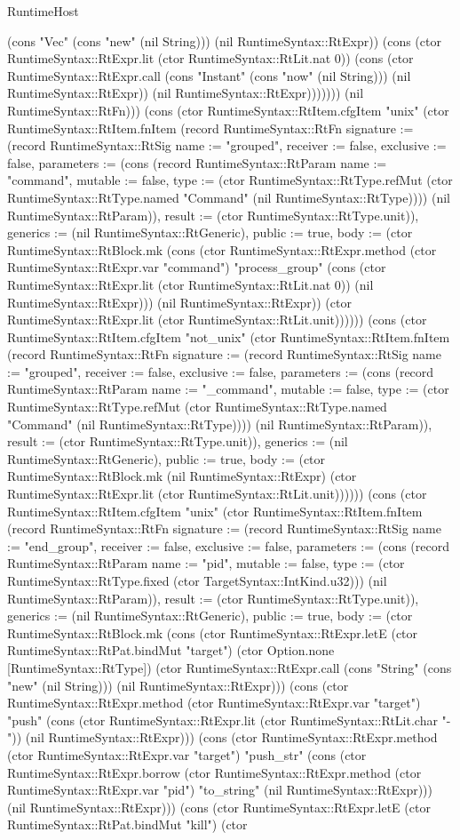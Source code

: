 \begin{lexlean}{RuntimeHost}
\begin{semanticmodule}
{(cons "Vec" (cons "new" (nil String))) (nil RuntimeSyntax::RtExpr)) (cons (ctor RuntimeSyntax::RtExpr.lit (ctor RuntimeSyntax::RtLit.nat 0)) (cons (ctor RuntimeSyntax::RtExpr.call (cons "Instant" (cons "now" (nil String))) (nil RuntimeSyntax::RtExpr)) (nil RuntimeSyntax::RtExpr))))))}) (nil RuntimeSyntax::RtFn))) (cons (ctor RuntimeSyntax::RtItem.cfgItem "unix" (ctor RuntimeSyntax::RtItem.fnItem (record RuntimeSyntax::RtFn {signature := (record RuntimeSyntax::RtSig {name := "grouped", receiver := false, exclusive := false, parameters := (cons (record RuntimeSyntax::RtParam {name := "command", mutable := false, type := (ctor RuntimeSyntax::RtType.refMut (ctor RuntimeSyntax::RtType.named "Command" (nil RuntimeSyntax::RtType)))}) (nil RuntimeSyntax::RtParam)), result := (ctor RuntimeSyntax::RtType.unit)}), generics := (nil RuntimeSyntax::RtGeneric), public := true, body := (ctor RuntimeSyntax::RtBlock.mk (cons (ctor RuntimeSyntax::RtExpr.method (ctor RuntimeSyntax::RtExpr.var "command") "process_group" (cons (ctor RuntimeSyntax::RtExpr.lit (ctor RuntimeSyntax::RtLit.nat 0)) (nil RuntimeSyntax::RtExpr))) (nil RuntimeSyntax::RtExpr)) (ctor RuntimeSyntax::RtExpr.lit (ctor RuntimeSyntax::RtLit.unit)))}))) (cons (ctor RuntimeSyntax::RtItem.cfgItem "not_unix" (ctor RuntimeSyntax::RtItem.fnItem (record RuntimeSyntax::RtFn {signature := (record RuntimeSyntax::RtSig {name := "grouped", receiver := false, exclusive := false, parameters := (cons (record RuntimeSyntax::RtParam {name := "_command", mutable := false, type := (ctor RuntimeSyntax::RtType.refMut (ctor RuntimeSyntax::RtType.named "Command" (nil RuntimeSyntax::RtType)))}) (nil RuntimeSyntax::RtParam)), result := (ctor RuntimeSyntax::RtType.unit)}), generics := (nil RuntimeSyntax::RtGeneric), public := true, body := (ctor RuntimeSyntax::RtBlock.mk (nil RuntimeSyntax::RtExpr) (ctor RuntimeSyntax::RtExpr.lit (ctor RuntimeSyntax::RtLit.unit)))}))) (cons (ctor RuntimeSyntax::RtItem.cfgItem "unix" (ctor RuntimeSyntax::RtItem.fnItem (record RuntimeSyntax::RtFn {signature := (record RuntimeSyntax::RtSig {name := "end_group", receiver := false, exclusive := false, parameters := (cons (record RuntimeSyntax::RtParam {name := "pid", mutable := false, type := (ctor RuntimeSyntax::RtType.fixed (ctor TargetSyntax::IntKind.u32))}) (nil RuntimeSyntax::RtParam)), result := (ctor RuntimeSyntax::RtType.unit)}), generics := (nil RuntimeSyntax::RtGeneric), public := true, body := (ctor RuntimeSyntax::RtBlock.mk (cons (ctor RuntimeSyntax::RtExpr.letE (ctor RuntimeSyntax::RtPat.bindMut "target") (ctor Option.none [RuntimeSyntax::RtType]) (ctor RuntimeSyntax::RtExpr.call (cons "String" (cons "new" (nil String))) (nil RuntimeSyntax::RtExpr))) (cons (ctor RuntimeSyntax::RtExpr.method (ctor RuntimeSyntax::RtExpr.var "target") "push" (cons (ctor RuntimeSyntax::RtExpr.lit (ctor RuntimeSyntax::RtLit.char "-")) (nil RuntimeSyntax::RtExpr))) (cons (ctor RuntimeSyntax::RtExpr.method (ctor RuntimeSyntax::RtExpr.var "target") "push_str" (cons (ctor RuntimeSyntax::RtExpr.borrow (ctor RuntimeSyntax::RtExpr.method (ctor RuntimeSyntax::RtExpr.var "pid") "to_string" (nil RuntimeSyntax::RtExpr))) (nil RuntimeSyntax::RtExpr))) (cons (ctor RuntimeSyntax::RtExpr.letE (ctor RuntimeSyntax::RtPat.bindMut "kill") (ctor }
\end{semanticmodule}
\end{lexlean}
